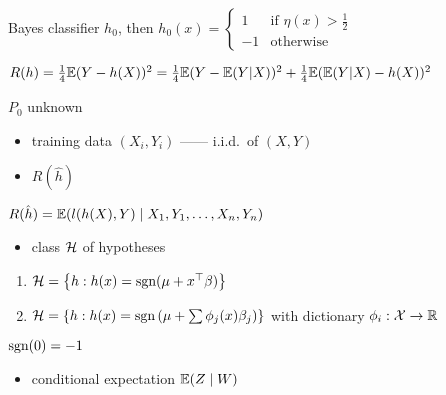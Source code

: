 \begin{prop}
    Bayes classifier $h_0$, then $h_0(x) = \begin{cases}
                                               1 & \text{if } \eta(x) > \frac{1}{2}\\
                                               -1 & \text{otherwise }
    \end{cases}$
\end{prop}
\begin{pf}
    $R(h) = \frac{1}{4}\mathbb{E}(Y - h(X))^2 = \frac{1}{4}\mathbb{E}(Y - \mathbb{E}(Y|X))^2 + \frac{1}{4}\mathbb{E}(\mathbb{E}(Y|X) - h(X))^2$
\end{pf}

\begin{setting}
    $P_0$ unknown
\end{setting}

\begin{itemize}
    \item training data $(X_i, Y_i)$ ------ i.i.d.\ of $(X, Y)$
    \item $R(\hat h)$
\end{itemize}

\begin{fact}
    $R(\hat h) = \mathbb{E}(l(h(X), Y) \mid X_1, Y_1, \dots, X_n, Y_n)$
\end{fact}

\begin{itemize}
    \item class $\mathcal{H}$ of hypotheses
\end{itemize}

\begin{example}
    \begin{enumerate}
        \item $\mathcal{H} = \left\{ h : h(x) = \textnormal{sgn} (\mu + x^\top \beta) \right\}$
        \item $\mathcal{H} = \left\{ h : h(x) = \textnormal{sgn} \left(\mu + \sum \phi_j(x)\beta_j\right) \right\}$ with dictionary $\phi_i : \mathcal{X} \rightarrow \mathbb{R}$
    \end{enumerate}
\end{example}

\begin{setting}
    $\textnormal{sgn}(0) = -1$
\end{setting}

\begin{itemize}
    \item conditional expectation $\mathbb{E}(Z \mid W)$
\end{itemize}

